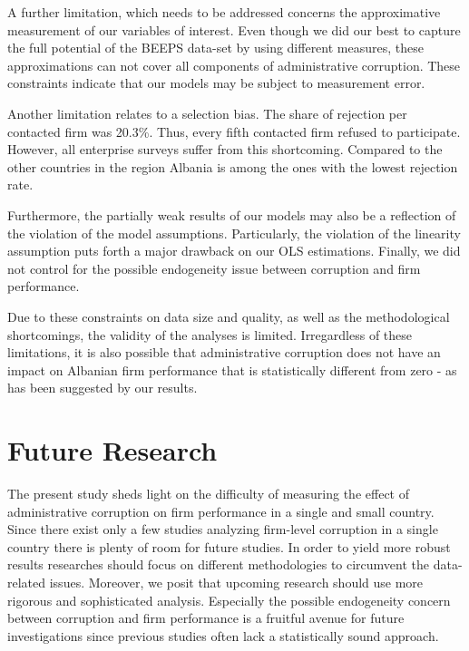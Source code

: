 A further limitation, which needs to be addressed concerns the approximative measurement of our variables of interest. Even though we did our best to capture the full potential of the BEEPS data-set by using different measures, these approximations can not cover all components of administrative corruption. These constraints indicate that our models may be subject to measurement error.

Another limitation relates to a selection bias. The share of rejection per contacted firm was 20.3\%. Thus, every fifth contacted firm refused to participate. However, all enterprise surveys suffer from this shortcoming. Compared to the other countries in the region Albania is among the ones with the lowest rejection rate. 

Furthermore, the partially weak results of our models may also be a reflection of the violation of the model assumptions. Particularly, the violation of the linearity assumption puts forth a major drawback on our OLS estimations. Finally, we did not control for the possible endogeneity issue between corruption and firm performance.

Due to these constraints on data size and quality, as well as the methodological shortcomings, the validity of the analyses is limited. Irregardless of these limitations, it is also possible that administrative corruption does not have an impact on Albanian firm performance that is statistically different from zero - as has been suggested by our results. 

\section{Future Research}
The present study sheds light on the difficulty of measuring the effect of administrative corruption on firm performance in a single and small country. Since there exist only a few studies analyzing firm-level corruption in a single country there is plenty of room for future studies. In order to yield more robust results researches should focus on different methodologies to circumvent the data-related issues. Moreover, we posit that upcoming research should use more rigorous and sophisticated analysis. Especially the possible endogeneity concern between corruption and firm performance is a fruitful avenue for future investigations since previous studies often lack a statistically sound approach. 


